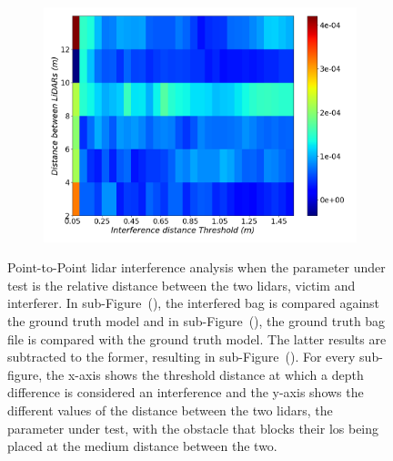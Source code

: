 \begin{figure}[!ht]
\begin{subfigure}[c]{0.45\textwidth}
	\label{fig:los:ground-truth-color-mesh}
\end{subfigure}
\\ \vspace{4mm}
\begin{subfigure}[c]{0.6\textwidth}
	\includegraphics[width=\textwidth]{img/lidar-interference/LOS/difference_ground_truth_interference_measurement.png}
\caption{}%
	\label{fig:los:difference-color-mesh}
\end{subfigure}

\caption[Point-to-Point analysis when the \ac{los} between the \acp{lidar} is obstructed and their relative distance is  variated.]{Point-to-Point \ac{lidar} interference analysis when the parameter under test is the relative distance between the two \acp{lidar}, victim and interferer. In sub-Figure~(), the interfered bag is compared against the ground truth model and in sub-Figure~(), the ground truth bag file is compared with the ground truth model. The latter results are subtracted to the former, resulting in sub-Figure~(). For every sub-figure, the x-axis shows the threshold distance at which a depth difference is considered an interference and the y-axis shows the different values of the distance between the two \acp{lidar}, the parameter under test, with the obstacle that blocks their \ac{los} being placed at the medium distance between the two.}
\label{fig:los:color-mesh}
\end{figure}

